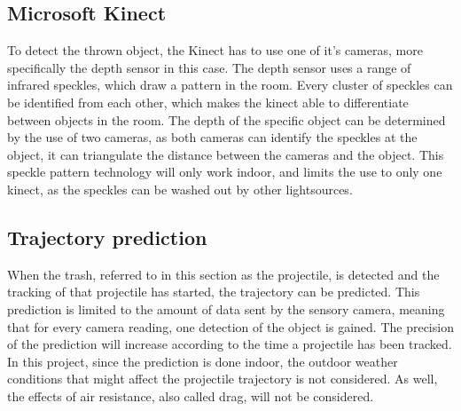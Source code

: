 \subsection{Microsoft Kinect}
\label{sec:i1Microsoft Kinect}
To detect the thrown object, the Kinect has to use one of it's cameras, more specifically the depth sensor in this case. The depth sensor uses a range of infrared speckles, which draw a pattern in the room. Every cluster of speckles can be identified from each other, which makes the kinect able to differentiate between objects in the room. The depth of the specific object can be determined by the use of two cameras, as both cameras can identify the speckles at the object, it can triangulate the distance between the cameras and the object. This speckle pattern technology will only work indoor, and limits the use to only one kinect, as the speckles can be washed out by other lightsources.
\citep{kw}

\subsection{Trajectory prediction}
\label{sec:Trajectory prediction}
When the trash, referred to in this section as the projectile, is detected and the tracking of that projectile has started, the trajectory can be predicted. This prediction is limited to the amount of data sent by the sensory camera, meaning that for every camera reading, one detection of the object is gained. The precision of the prediction will increase according to the time a projectile has been tracked. \newline 
In this project, since the prediction is done indoor, the outdoor weather conditions that might affect the projectile trajectory is not considered. As well, the effects of air resistance, also called drag, will not be considered.


